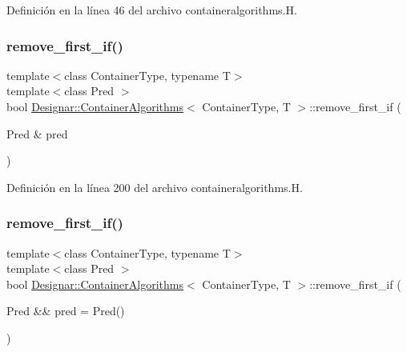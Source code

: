 Definición en la línea 46 del archivo containeralgorithms.\+H.

\mbox{\label{class_designar_1_1_container_algorithms_a955cc52c438153802a20a97d3e4c148a}} 
\subsubsection{\texorpdfstring{remove\+\_\+first\+\_\+if()}{remove\_first\_if()}\hspace{0.1cm}{\footnotesize\ttfamily [1/2]}}
{\footnotesize\ttfamily template$<$class Container\+Type, typename T$>$ \\
template$<$class Pred $>$ \\
bool \hyperlink{class_designar_1_1_container_algorithms}{Designar\+::\+Container\+Algorithms}$<$ Container\+Type, T $>$\+::remove\+\_\+first\+\_\+if (\begin{DoxyParamCaption}\item[{Pred \&}]{pred }\end{DoxyParamCaption})\hspace{0.3cm}{\ttfamily [inline]}}



Definición en la línea 200 del archivo containeralgorithms.\+H.

\mbox{\label{class_designar_1_1_container_algorithms_a564239c787d638bfd90846c9587cd6a6}} 
\subsubsection{\texorpdfstring{remove\+\_\+first\+\_\+if()}{remove\_first\_if()}\hspace{0.1cm}{\footnotesize\ttfamily [2/2]}}
{\footnotesize\ttfamily template$<$class Container\+Type, typename T$>$ \\
template$<$class Pred $>$ \\
bool \hyperlink{class_designar_1_1_container_algorithms}{Designar\+::\+Container\+Algorithms}$<$ Container\+Type, T $>$\+::remove\+\_\+first\+\_\+if (\begin{DoxyParamCaption}\item[{Pred \&\&}]{pred = {\ttfamily Pred()} }\end{DoxyParamCaption})\hspace{0.3cm}{\ttfamily [inline]}}



